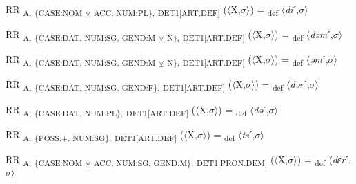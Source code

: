 {\begin{exe}
 RR \textsubscript{A,} \textsubscript{\{CASE:NOM} \textsubscript{${\veebar}$}\textsubscript{ ACC, NUM:PL\},} \textsubscript{DET1[ART.DEF]} ($\langle$X,$\sigma $$\rangle$) = \textsubscript{def} $\langle$\textit{di}ˊ,$\sigma $$\rangle$
\end{exe}

\begin{exe}
 RR \textsubscript{A,} \textsubscript{\{CASE:DAT, NUM:SG, GEND:M} \textsubscript{${\veebar}$}\textsubscript{ N\},} \textsubscript{DET1[ART.DEF]} ($\langle$X,$\sigma $$\rangle$) = \textsubscript{def} $\langle$\textit{dəm}ˊ,$\sigma $$\rangle$
\end{exe}

\begin{exe}
 RR \textsubscript{A,} \textsubscript{\{CASE:DAT, NUM:SG, GEND:M} \textsubscript{${\veebar}$}\textsubscript{ N\},} \textsubscript{DET1[ART.DEF]} ($\langle$X,$\sigma $$\rangle$) = \textsubscript{def} $\langle$\textit{əm}ˊ,$\sigma $$\rangle$
\end{exe}

\begin{exe}
 RR \textsubscript{A,} \textsubscript{\{CASE:DAT, NUM:SG, GEND:F\},} \textsubscript{DET1[ART.DEF]} ($\langle$X,$\sigma $$\rangle$) = \textsubscript{def} $\langle$\textit{dər}ˊ,$\sigma $$\rangle$
\end{exe}

\begin{exe}
 RR \textsubscript{A,} \textsubscript{\{CASE:DAT, NUM:PL\},} \textsubscript{DET1[ART.DEF]} ($\langle$X,$\sigma $$\rangle$) = \textsubscript{def} $\langle$\textit{də}ˊ,$\sigma $$\rangle$
\end{exe}

\begin{exe}
 RR \textsubscript{A,} \textsubscript{\{POSS:+, NUM:SG\},} \textsubscript{DET1[ART.DEF]} ($\langle$X,$\sigma $$\rangle$) = \textsubscript{def} $\langle$\textit{ts}ˊ,$\sigma $$\rangle$
\end{exe}

\begin{exe}
 RR \textsubscript{A,} \textsubscript{\{CASE:NOM} \textsubscript{${\veebar}$}\textsubscript{ ACC, NUM:SG, GEND:M\},} \textsubscript{DET1[PRON.DEM]} ($\langle$X,$\sigma $$\rangle$) = \textsubscript{def} $\langle$\textit{dɛr}ˊ,$\sigma $$\rangle$
\end{exe}

}
